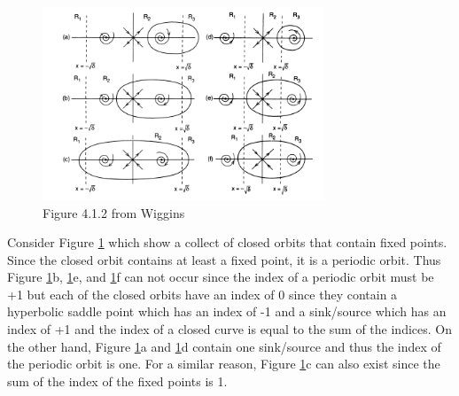\documentclass[12pt]{report}
\begin{document}
\begin{solution}
    
    \begin{figure}
        \centering
        \includegraphics[width=0.75\textwidth,height=\textwidth,keepaspectratio]{images/2.png}
        \caption{Figure 4.1.2 from Wiggins}
        \label{figQ2}
    \end{figure}

    \noindent
    Consider Figure \ref{figQ2} which show a collect of closed orbits that contain fixed points. Since the closed orbit contains at least a fixed point, it is a periodic orbit. Thus Figure \ref{figQ2}b, \ref{figQ2}e, and \ref{figQ2}f can not occur since the index of a periodic orbit must be +1 but each of the closed orbits have an index of 0 since they contain a hyperbolic saddle point which has an index of -1 and a sink/source which has an index of +1 and the index of a closed curve is equal to the sum of the indices. On the other hand, Figure \ref{figQ2}a and \ref{figQ2}d contain one sink/source and thus the index of the periodic orbit is one. For a similar reason, Figure \ref{figQ2}c can also exist since the sum of the index of the fixed points is 1. 

\end{solution}

\newpage
\end{document}
